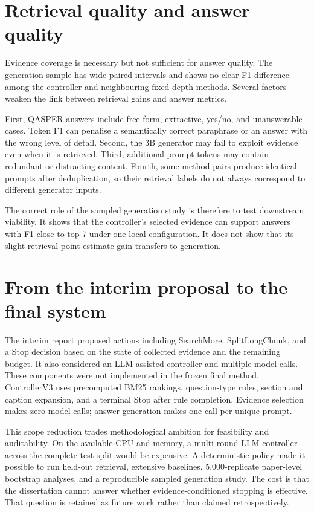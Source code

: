 \section{Retrieval quality and answer quality}

Evidence coverage is necessary but not sufficient for answer quality. The generation sample has wide paired intervals and shows no clear F1 difference among the controller and neighbouring fixed-depth methods. Several factors weaken the link between retrieval gains and answer metrics.

First, QASPER answers include free-form, extractive, yes/no, and unanswerable cases. Token F1 can penalise a semantically correct paraphrase or an answer with the wrong level of detail. Second, the 3B generator may fail to exploit evidence even when it is retrieved. Third, additional prompt tokens may contain redundant or distracting content. Fourth, some method pairs produce identical prompts after deduplication, so their retrieval labels do not always correspond to different generator inputs.

The correct role of the sampled generation study is therefore to test downstream viability. It shows that the controller's selected evidence can support answers with F1 close to top-7 under one local configuration. It does not show that its slight retrieval point-estimate gain transfers to generation.

\section{From the interim proposal to the final system}

The interim report proposed actions including SearchMore, SplitLongChunk, and a Stop decision based on the state of collected evidence and the remaining budget. It also considered an LLM-assisted controller and multiple model calls. These components were not implemented in the frozen final method. ControllerV3 uses precomputed BM25 rankings, question-type rules, section and caption expansion, and a terminal Stop after rule completion. Evidence selection makes zero model calls; answer generation makes one call per unique prompt.

This scope reduction trades methodological ambition for feasibility and auditability. On the available CPU and memory, a multi-round LLM controller across the complete test split would be expensive. A deterministic policy made it possible to run held-out retrieval, extensive baselines, 5,000-replicate paper-level bootstrap analyses, and a reproducible sampled generation study. The cost is that the dissertation cannot answer whether evidence-conditioned stopping is effective. That question is retained as future work rather than claimed retrospectively.

